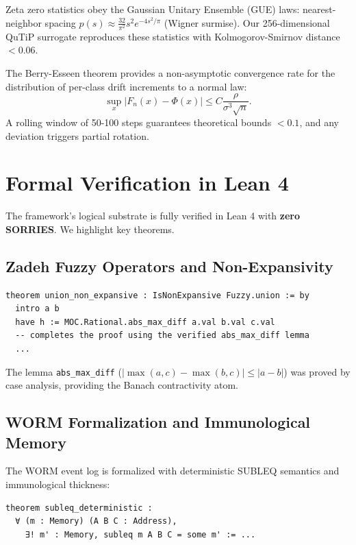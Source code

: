 \documentclass[11pt,a4paper]{article}
\theoremstyle{definition}
\theoremstyle{remark}
\begin{document}
Zeta zero statistics obey the Gaussian Unitary Ensemble (GUE) laws: nearest-neighbor spacing $p(s) \approx \frac{32}{\pi^2}s^2 e^{-4s^2/\pi}$ (Wigner surmise). Our 256-dimensional QuTiP surrogate reproduces these statistics with Kolmogorov-Smirnov distance $< 0.06$.

The Berry-Esseen theorem provides a non-asymptotic convergence rate for the distribution of per-class drift increments to a normal law:
\[
\sup_x \left| F_n(x) - \Phi(x) \right| \le C\frac{\rho}{\sigma^3\sqrt{n}}.
\]
A rolling window of 50-100 steps guarantees theoretical bounds $<0.1$, and any deviation triggers partial rotation.

\section{Formal Verification in Lean 4}
\label{sec:lean}

The framework's logical substrate is fully verified in Lean 4 with \textbf{zero SORRIES}. We highlight key theorems.

\subsection{Zadeh Fuzzy Operators and Non-Expansivity}
\label{subsec:lean_fuzzy}

\begin{lstlisting}[language=Lean, caption={Non-expansivity of the Zadeh union operator (MOC/Fuzzy.lean)}]
theorem union_non_expansive : IsNonExpansive Fuzzy.union := by
  intro a b
  have h := MOC.Rational.abs_max_diff a.val b.val c.val
  -- completes the proof using the verified abs_max_diff lemma
  ...
\end{lstlisting}

The lemma \texttt{abs\_max\_diff} ($|\max(a,c)-\max(b,c)| \le |a-b|$) was proved by case analysis, providing the Banach contractivity atom.

\subsection{WORM Formalization and Immunological Memory}
\label{subsec:lean_worm}

The WORM event log is formalized with deterministic SUBLEQ semantics and immunological thickness:

\begin{lstlisting}[language=Lean, caption={Deterministic SUBLEQ semantics (WORM.lean)}]
theorem subleq_deterministic : 
  ∀ (m : Memory) (A B C : Address),
    ∃! m' : Memory, subleq m A B C = some m' := ...
\end{lstlisting}
\end{document}
